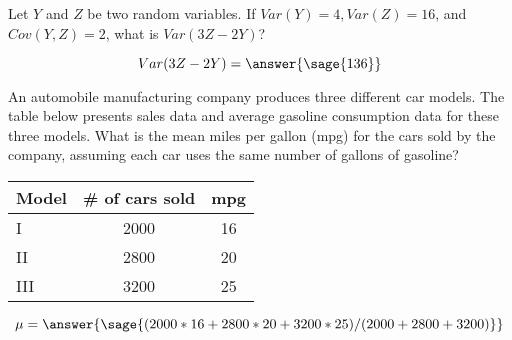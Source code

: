 \documentclass{ximera}
\begin{document}
\begin{problem}
Let $Y$ and $Z$ be two random variables. If $Var(Y) = 4, Var(Z) = 16 $, and $Cov(Y,Z) = 2$, what is $Var(3Z-2Y)$?

\begin{prompt}
$$
Var(3Z-2Y)=\answer{\sage{136}}
$$
\end{prompt}

\end{problem}

\begin{problem}
An automobile manufacturing company produces three different car models. The table below presents sales data and average gasoline consumption data for these three models. What is the mean miles per gallon (mpg) for the cars sold by the company, assuming each car uses the same number of gallons of gasoline?

\begin{tabular}[hc]{l|c|c}
Model & \# of cars sold & mpg \\
\hline
I & 2000 & 16 \\
\hline
II & 2800 & 20 \\
\hline
III & 3200 & 25 \\
\end{tabular}
\begin{prompt}
$$
\mu=\answer{\sage{(2000*16+2800*20+3200*25)/(2000+2800+3200)}}
$$
\end{prompt}

\end{problem}
\end{document}
